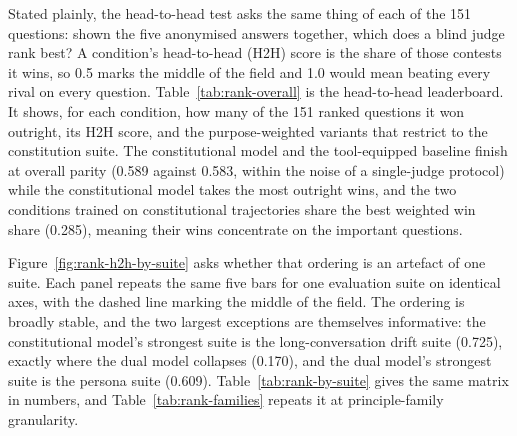 Stated plainly, the head-to-head test asks the same thing of each of the 151 questions: shown the five anonymised answers together, which does a blind judge rank best? A condition's head-to-head (H2H) score is the share of those contests it wins, so 0.5 marks the middle of the field and 1.0 would mean beating every rival on every question. Table~\ref{tab:rank-overall} is the head-to-head leaderboard. It shows, for each condition, how many of the 151 ranked questions it won outright, its H2H score, and the purpose-weighted variants that restrict to the constitution suite. The constitutional model and the tool-equipped baseline finish at overall parity (0.589 against 0.583, within the noise of a single-judge protocol) while the constitutional model takes the most outright wins, and the two conditions trained on constitutional trajectories share the best weighted win share (0.285), meaning their wins concentrate on the important questions.



Figure~\ref{fig:rank-h2h-by-suite} asks whether that ordering is an artefact of one suite. Each panel repeats the same five bars for one evaluation suite on identical axes, with the dashed line marking the middle of the field. The ordering is broadly stable, and the two largest exceptions are themselves informative: the constitutional model's strongest suite is the long-conversation drift suite (0.725), exactly where the dual model collapses (0.170), and the dual model's strongest suite is the persona suite (0.609). Table~\ref{tab:rank-by-suite} gives the same matrix in numbers, and Table~\ref{tab:rank-families} repeats it at principle-family granularity.

